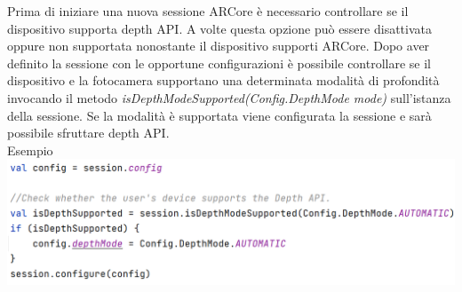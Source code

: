 \documentclass[crop=false, class=book]{standalone}
\begin{document}
		Prima di iniziare una nuova sessione ARCore è necessario controllare se il dispositivo supporta depth API. A volte 				questa opzione può essere disattivata oppure non supportata nonostante il dispositivo supporti ARCore. Dopo aver 				definito la sessione con le opportune configurazioni è possibile controllare se il dispositivo e la fotocamera 					supportano una determinata modalità di profondità invocando il metodo \textit{isDepthModeSupported(Config.DepthMode 			mode)} sull'istanza della sessione. Se la modalità è supportata viene configurata la sessione e sarà possibile 					sfruttare depth  API.\\
		Esempio\\
		\includegraphics[scale=0.5]{../resources/images/depthAPI1.PNG}
		
	
		
		
\end{document}
